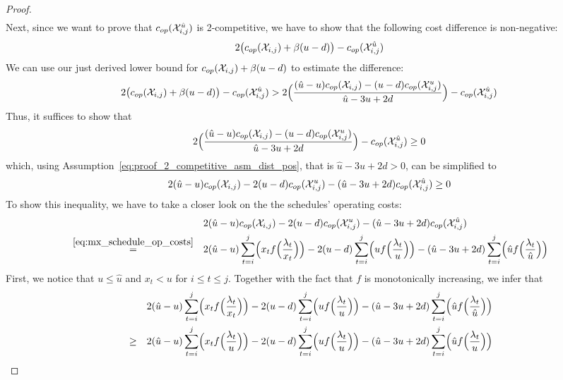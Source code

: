\begin{proof}
\begin{align*}
\end{align*}
Next, since we want to prove that $c_{op}(\mathcal{X}_{i,j}^{\hat{u}})$ is 2-competitive, we have to show that the following cost difference is non-negative:
\begin{align*}
	2\bigl(c_{op}(\mathcal{X}_{i,j})+\beta(u-d)\bigr)-c_{op}(\mathcal{X}_{i,j}^{\hat{u}})
\end{align*}
We can use our just derived lower bound for $c_{op}(\mathcal{X}_{i,j})+\beta(u-d)$ to estimate the difference:
\begin{align*}
	2\bigl(c_{op}(\mathcal{X}_{i,j})+\beta(u-d)\bigr)-c_{op}(\mathcal{X}_{i,j}^{\hat{u}})>2\Bigl(\frac{(\hat{u}-u)c_{op}(\mathcal{X}_{i,j})-(u-d)c_{op}(\mathcal{X}_{i,j}^u)}{\hat{u}-3u+2d}\Bigr)-c_{op}(\mathcal{X}_{i,j}^{\hat{u}})
\end{align*}
Thus, it suffices to show that
\begin{align*}
	2\Bigl(\frac{(\hat{u}-u)c_{op}(\mathcal{X}_{i,j})-(u-d)c_{op}(\mathcal{X}_{i,j}^u)}{\hat{u}-3u+2d}\Bigr)-c_{op}(\mathcal{X}_{i,j}^{\hat{u}})\ge 0
\end{align*}
which, using Assumption~\eqref{eq:proof_2_competitive_asm_dist_pos}, that is $\hat{u}-3u+2d>0$, can be simplified to
\begin{equation*}
	2(\hat{u}-u)c_{op}(\mathcal{X}_{i,j})-2(u-d)c_{op}(\mathcal{X}_{i,j}^u)-(\hat{u}-3u+2d)c_{op}(\mathcal{X}_{i,j}^{\hat{u}})\ge 0
\end{equation*}
To show this inequality, we have to take a closer look on the the schedules' operating costs:
\begin{align*}
	&&&2(\hat{u}-u)c_{op}(\mathcal{X}_{i,j})-2(u-d)c_{op}(\mathcal{X}_{i,j}^u)-(\hat{u}-3u+2d)c_{op}(\mathcal{X}_{i,j}^{\hat{u}})\\
	&\stackrel{\eqref{eq:mx_schedule_op_costs}}{=}&&2(\hat{u}-u)\sum\limits_{t=i}^j\Bigl(x_tf\Bigl(\frac{\lambda_t}{x_t}\Bigr)\Bigr)-2(u-d)\sum\limits_{t=i}^j\Bigl(uf\Bigl(\frac{\lambda_t}{u}\Bigr)\Bigr)-(\hat{u}-3u+2d)\sum\limits_{t=i}^j\Bigl(\hat{u}f\Bigl(\frac{\lambda_t}{\hat{u}}\Bigr)\Bigr)
\end{align*}
First, we notice that $u\le\hat{u}$ and $x_t<u$ for $i\le t\le j$. Together with the fact that $f$ is monotonically increasing, we infer that
\begin{align*}
	&&&2(\hat{u}-u)\sum\limits_{t=i}^j\Bigl(x_tf\Bigl(\frac{\lambda_t}{x_t}\Bigr)\Bigr)-2(u-d)\sum\limits_{t=i}^j\Bigl(uf\Bigl(\frac{\lambda_t}{u}\Bigr)\Bigr)-(\hat{u}-3u+2d)\sum\limits_{t=i}^j\Bigl(\hat{u}f\Bigl(\frac{\lambda_t}{\hat{u}}\Bigr)\Bigr)\\
	&\ge&&2(\hat{u}-u)\sum\limits_{t=i}^j\Bigl(x_tf\Bigl(\frac{\lambda_t}{u}\Bigr)\Bigr)-2(u-d)\sum\limits_{t=i}^j\Bigl(uf\Bigl(\frac{\lambda_t}{u}\Bigr)\Bigr)-(\hat{u}-3u+2d)\sum\limits_{t=i}^j\Bigl(\hat{u}f\Bigl(\frac{\lambda_t}{u}\Bigr)\Bigr)

\end{align*}
\end{proof}
